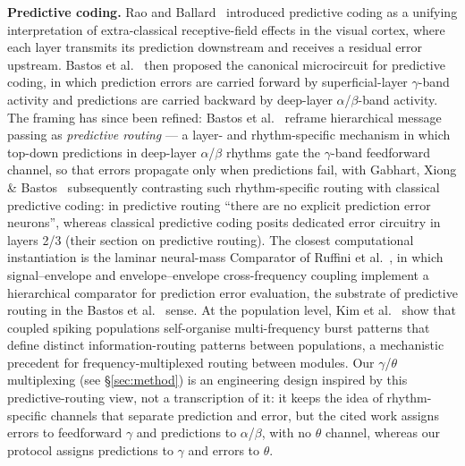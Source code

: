 \documentclass[10pt,twocolumn]{article}
\begin{document}
\textbf{Predictive coding.} Rao and Ballard~\cite{rao1999predictive} introduced predictive coding as a unifying interpretation of extra-classical receptive-field effects in the visual cortex, where each layer transmits its prediction downstream and receives a residual error upstream. Bastos et al.~\cite{bastos2012canonical} then proposed the canonical microcircuit for predictive coding, in which prediction errors are carried forward by superficial-layer $\gamma$-band activity and predictions are carried backward by deep-layer $\alpha$/$\beta$-band activity. The framing has since been refined: Bastos et
al.~\cite{bastos2020routing} reframe hierarchical message passing as
\emph{predictive routing} --- a layer- and rhythm-specific mechanism in
which top-down predictions in deep-layer $\alpha$/$\beta$ rhythms gate
the $\gamma$-band feedforward channel, so that errors propagate only
when predictions fail, with Gabhart, Xiong \& Bastos~\cite{gabhart2025predictive} subsequently
contrasting such rhythm-specific routing with classical predictive coding:
in predictive routing ``there are no explicit prediction error neurons'',
whereas classical predictive coding posits dedicated error circuitry in
layers 2/3 (their section on predictive routing).
The closest computational instantiation
is the laminar neural-mass Comparator of Ruffini et
al.~\cite{ruffini2025comparator}, in which signal--envelope and
envelope--envelope cross-frequency coupling implement a hierarchical comparator for prediction error evaluation, the substrate of predictive routing in the Bastos et al.~\cite{bastos2020routing} sense.
At the population level, Kim et al.~\cite{kim2026crossfreqbursts} show that coupled
spiking populations self-organise multi-frequency burst patterns that define distinct
information-routing patterns between populations, a mechanistic precedent for
frequency-multiplexed routing between modules.
Our $\gamma$/$\theta$ multiplexing (see \S\ref{sec:method}) is an
engineering design inspired by this predictive-routing view, not a
transcription of it: it keeps the idea of rhythm-specific channels that
separate prediction and error, but the cited work assigns errors to
feedforward $\gamma$ and predictions to $\alpha$/$\beta$, with no
$\theta$ channel, whereas our protocol assigns predictions to $\gamma$
and errors to $\theta$.
\end{document}
